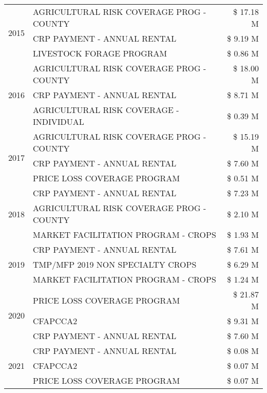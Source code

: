 \begin{tabular}{llr}
\cline{1-3}
\multirow[t]{3}{*}{2015} & AGRICULTURAL RISK COVERAGE PROG - COUNTY & \$ 17.18 M \\
 & CRP PAYMENT - ANNUAL RENTAL & \$ 9.19 M \\
 & LIVESTOCK FORAGE PROGRAM & \$ 0.86 M \\
\cline{1-3}
\multirow[t]{3}{*}{2016} & AGRICULTURAL RISK COVERAGE PROG - COUNTY & \$ 18.00 M \\
 & CRP PAYMENT - ANNUAL RENTAL & \$ 8.71 M \\
 & AGRICULTURAL RISK COVERAGE - INDIVIDUAL & \$ 0.39 M \\
\cline{1-3}
\multirow[t]{3}{*}{2017} & AGRICULTURAL RISK COVERAGE PROG - COUNTY & \$ 15.19 M \\
 & CRP PAYMENT - ANNUAL RENTAL & \$ 7.60 M \\
 & PRICE LOSS COVERAGE PROGRAM & \$ 0.51 M \\
\cline{1-3}
\multirow[t]{3}{*}{2018} & CRP PAYMENT - ANNUAL RENTAL & \$ 7.23 M \\
 & AGRICULTURAL RISK COVERAGE PROG - COUNTY & \$ 2.10 M \\
 & MARKET FACILITATION PROGRAM - CROPS & \$ 1.93 M \\
\cline{1-3}
\multirow[t]{3}{*}{2019} & CRP PAYMENT - ANNUAL RENTAL & \$ 7.61 M \\
 & TMP/MFP 2019 NON SPECIALTY CROPS & \$ 6.29 M \\
 & MARKET FACILITATION PROGRAM - CROPS & \$ 1.24 M \\
\cline{1-3}
\multirow[t]{3}{*}{2020} & PRICE LOSS COVERAGE PROGRAM & \$ 21.87 M \\
 & CFAPCCA2 & \$ 9.31 M \\
 & CRP PAYMENT - ANNUAL RENTAL & \$ 7.60 M \\
\cline{1-3}
\multirow[t]{3}{*}{2021} & CRP PAYMENT - ANNUAL RENTAL & \$ 0.08 M \\
 & CFAPCCA2 & \$ 0.07 M \\
 & PRICE LOSS COVERAGE PROGRAM & \$ 0.07 M \\
\cline{1-3}
\bottomrule
\end{tabular}
